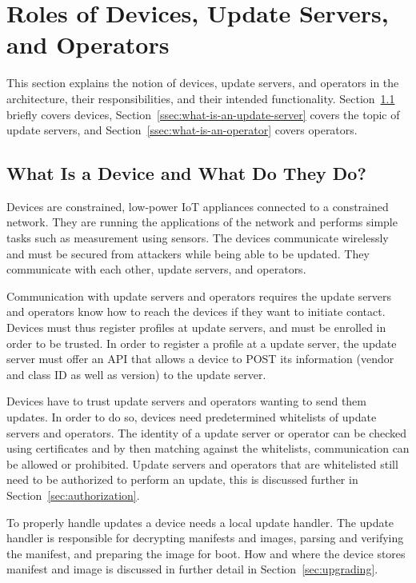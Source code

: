 \documentclass[0-thesis.tex]{subfiles}
\begin{document}
\section{Roles of Devices, Update Servers, and Operators}
\label{sec:roles}
This section explains the notion of devices, update servers, and operators in the
architecture, their responsibilities, and their intended functionality.
Section~\ref{ssec:what-is-a-device} briefly covers devices,
Section~\ref{ssec:what-is-an-update-server} covers the topic of update servers, and
Section~\ref{ssec:what-is-an-operator} covers operators.

\subsection{What Is a Device and What Do They Do?}
\label{ssec:what-is-a-device}
Devices are constrained, low-power IoT appliances connected to a constrained network. They
are running the applications of the network and performs simple tasks such as measurement
using sensors. The devices communicate wirelessly and must be secured from attackers while
being able to be updated. They communicate with each other, update servers, and operators.

Communication with update servers and operators requires the update servers and operators
know how to reach the devices if they want to initiate contact. Devices must thus register
profiles at update servers, and must be enrolled in order to be trusted. In order to
register a profile at a update server, the update server must offer an API that allows a
device to POST its information (vendor and class ID as well as version) to the update
server. 

Devices have to trust update servers and operators wanting to send them updates. In order
to do so, devices need predetermined whitelists of update servers and operators. The
identity of a update server or operator can be checked using certificates and by then
matching against the whitelists, communication can be allowed or prohibited. Update
servers and operators that are whitelisted still need to be authorized to perform an
update, this is discussed further in Section~\ref{sec:authorization}.

To properly handle updates a device needs a local update handler. The update handler is
responsible for decrypting manifests and images, parsing and verifying the manifest, and
preparing the image for boot. How and where the device stores manifest and image is
discussed in further detail in Section~\ref{sec:upgrading}.
\end{document}
